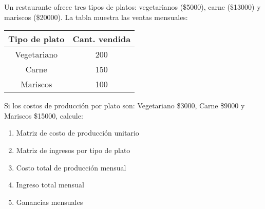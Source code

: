 \begin{prob} 
Un restaurante ofrece tres tipos de platos: vegetarianos (\$5000), carne (\$13000) y mariscos (\$20000). La tabla muestra las ventas mensuales:

\begin{table}[H]\centering
\begin{tabular}{|c||c|}\hline
Tipo de plato & Cant. vendida \\\hline
Vegetariano & 200 \\
Carne & 150 \\
Mariscos & 100 \\\hline
\end{tabular}
\end{table}

Si los costos de producción por plato son: Vegetariano \$3000, Carne \$9000 y Mariscos \$15000, calcule:
\begin{enumerate}[$(a)$]
\item Matriz de costo de producción unitario
\item Matriz de ingresos por tipo de plato
\item Costo total de producción mensual
\item Ingreso total mensual
\item Ganancias mensuales
\end{enumerate}
\end{prob}

